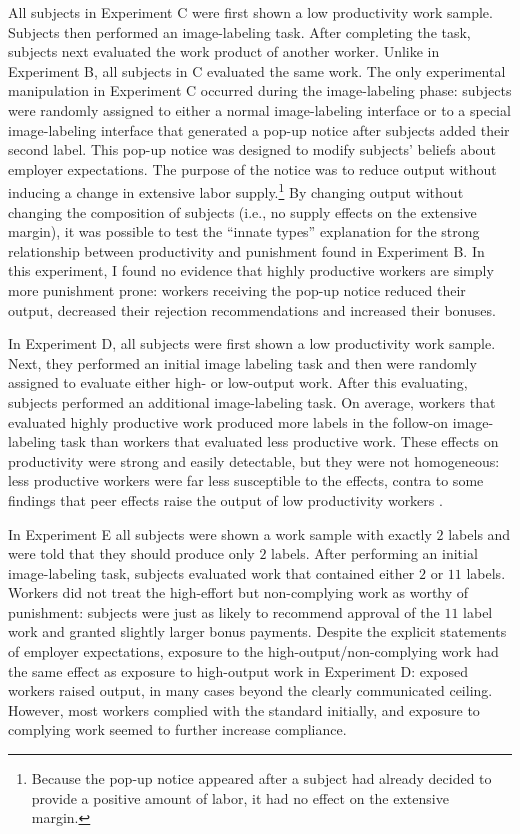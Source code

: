 \documentclass[12pt]{article}
\begin{document}
All subjects in Experiment C were first shown a low productivity work
sample. Subjects then performed an image-labeling task. After
completing the task, subjects next evaluated the work product of
another worker. Unlike in Experiment B, all subjects in C evaluated
the same work. The only experimental manipulation in Experiment C
occurred during the image-labeling phase: subjects were randomly
assigned to either a normal image-labeling interface or to a special
image-labeling interface that generated a pop-up notice after subjects
added their second label. This pop-up notice was designed to modify
subjects' beliefs about employer expectations. The purpose of the
notice was to reduce output without inducing a change in extensive
labor supply.\footnote{Because the pop-up notice appeared after a
  subject had already decided to provide a positive amount of labor,
  it had no effect on the extensive margin.} By changing output
without changing the composition of subjects (i.e., no supply effects
on the extensive margin), it was possible to test the ``innate types''
explanation for the strong relationship between productivity and
punishment found in Experiment B. In this experiment, I found no
evidence that highly productive workers are simply more punishment
prone: workers receiving the pop-up notice reduced their output,
decreased their rejection recommendations and increased their bonuses.

In Experiment D, all subjects were first shown a low productivity work
sample. Next, they performed an initial image labeling task and then
were randomly assigned to evaluate either high- or low-output
work. After this evaluating, subjects performed an additional
image-labeling task. On average, workers that evaluated highly
productive work produced more labels in the follow-on image-labeling
task than workers that evaluated less productive work. These effects
on productivity were strong and easily detectable, but they were not
homogeneous: less productive workers were far less susceptible to the
effects, contra to some findings that peer effects raise the output of
low productivity workers \citep{falk2006clean,mas2009peers}.

In Experiment E all subjects were shown a work sample with exactly $2$
labels and were told that they should produce only $2$ labels. After
performing an initial image-labeling task, subjects evaluated work
that contained either $2$ or $11$ labels. Workers did not treat the
high-effort but non-complying work as worthy of punishment: subjects
were just as likely to recommend approval of the $11$ label work and
granted slightly larger bonus payments. Despite the explicit
statements of employer expectations, exposure to the
high-output/non-complying work had the same effect as exposure to
high-output work in Experiment D: exposed workers raised output, in
many cases beyond the clearly communicated ceiling. However, most
workers complied with the standard initially, and exposure to
complying work seemed to further increase compliance.
\end{document}
